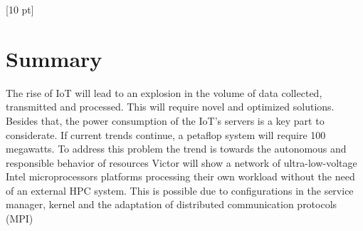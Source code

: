 \titleformat{\chapter}{\Huge\bfseries}{\thechapter}{0 pt}{\rule{340 pt}{3 pt}\\}
\titlespacing{\chapter}{100 pt}{-25 pt}{40 pt}[10 pt]	
\pagestyle{fancy}
\fancyhead[RO,RE]{\thepage}
\fancyfoot[CO,CE]{}

\chapter*{Summary}


\normalsize
\noindent The rise of IoT will lead to an explosion in the volume of data
collected, transmitted and processed. This will require novel and optimized
solutions. Besides that, the power consumption of the IoT’s servers is a key
part to considerate. If current trends continue, a petaflop system will require
100 megawatts. To address this problem the trend is towards the autonomous and
responsible behavior of resources Victor will show a network of
ultra-low-voltage Intel microprocessors platforms processing their own workload
without the need of an external HPC system. This is possible due to
configurations in the service manager, kernel and the adaptation of distributed
communication protocols (MPI) 
\clearpage
